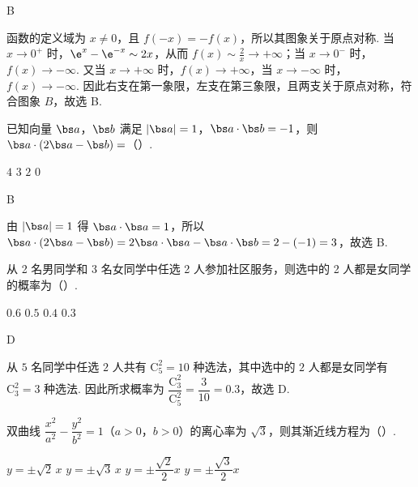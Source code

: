 \begin{answer}
B
\end{answer}

\begin{solution}
函数的定义域为 \(x\ne0\)，且 \(f(-x)=-f(x)\)，所以其图象关于原点对称. 当 \(x\to0^+\) 时，\(\e^x-\e^{-x}\sim2x\)，从而 \(f(x)\sim\frac{2}{x}\to+\infty\)；当 \(x\to0^-\) 时，\(f(x)\to-\infty\). 又当 \(x\to+\infty\) 时，\(f(x)\to+\infty\)，当 \(x\to-\infty\) 时，\(f(x)\to-\infty\). 因此右支在第一象限，左支在第三象限，且两支关于原点对称，符合图象 \(B\)，故选 B.
\end{solution}

\begin{problem}
已知向量 \(\bs a\)，\(\bs b\) 满足 \(\lvert \bs a\rvert=1\)，\(\bs a\cdot\bs b=-1\)，则 \(\bs a\cdot(2\bs a-\bs b)=\)（\quad）.

\choices
    {\(4\)}
    {\(3\)}
    {\(2\)}
    {\(0\)}
\end{problem}

\begin{answer}
B
\end{answer}

\begin{solution}
由 \(\lvert\bs a\rvert=1\) 得 \(\bs a\cdot\bs a=1\)，所以
\(\bs a\cdot(2\bs a-\bs b)=2\bs a\cdot\bs a-\bs a\cdot\bs b=2-(-1)=3\)，故选 B.
\end{solution}

\begin{problem}
从 2 名男同学和 3 名女同学中任选 2 人参加社区服务，则选中的 2 人都是女同学的概率为（\quad）.

\choices
    {\(0.6\)}
    {\(0.5\)}
    {\(0.4\)}
    {\(0.3\)}
\end{problem}

\begin{answer}
D
\end{answer}

\begin{solution}
从 \(5\) 名同学中任选 \(2\) 人共有 \(\mathrm C_5^2=10\) 种选法，其中选中的 \(2\) 人都是女同学有 \(\mathrm C_3^2=3\) 种选法. 因此所求概率为 \(\dfrac{\mathrm C_3^2}{\mathrm C_5^2}=\dfrac3{10}=0.3\)，故选 D.
\end{solution}

\begin{problem}
双曲线 \(\dfrac{x^2}{a^2}-\dfrac{y^2}{b^2}=1\)（\(a>0\)，\(b>0\)）的离心率为 \(\sqrt3\)，则其渐近线方程为（\quad）.

\choices
    {\(y=\pm\sqrt2\,x\)}
    {\(y=\pm\sqrt3\,x\)}
    {\(y=\pm\dfrac{\sqrt2}{2}x\)}
    {\(y=\pm\dfrac{\sqrt3}{2}x\)}
\end{problem}

